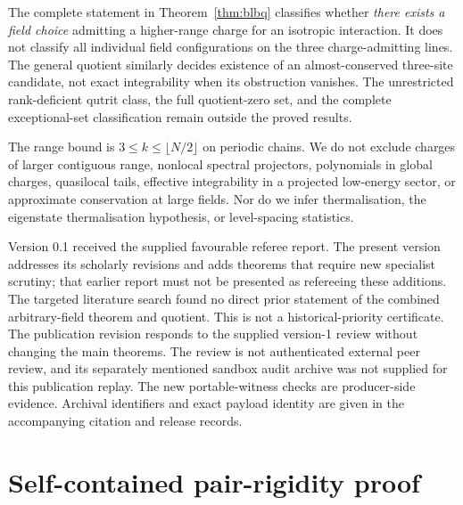 \documentclass[11pt,a4paper]{article}
\numberwithin{equation}{section}
\theoremstyle{definition}\newtheorem{definition}[theorem]{Definition}
\theoremstyle{remark}\newtheorem{remark}[theorem]{Remark}
\begin{document}
The complete statement in Theorem~\ref{thm:blbq} classifies whether \emph{there exists a field choice} admitting a higher-range charge for an isotropic interaction. It does not classify all individual field configurations on the three charge-admitting lines. The general quotient similarly decides existence of an almost-conserved three-site candidate, not exact integrability when its obstruction vanishes. The unrestricted rank-deficient qutrit class, the full quotient-zero set, and the complete exceptional-set classification remain outside the proved results.

The range bound is $3\le k\le\lfloor N/2\rfloor$ on periodic chains. We do not exclude charges of larger contiguous range, nonlocal spectral projectors, polynomials in global charges, quasilocal tails, effective integrability in a projected low-energy sector, or approximate conservation at large fields. Nor do we infer thermalisation, the eigenstate thermalisation hypothesis, or level-spacing statistics.

Version 0.1 received the supplied favourable referee report. The present version addresses its scholarly revisions and adds theorems that require new specialist scrutiny; that earlier report must not be presented as refereeing these additions. The targeted literature search found no direct prior statement of the combined arbitrary-field theorem and quotient. This is not a historical-priority certificate. The publication revision responds to the supplied version-1 review without changing the main theorems. The review is not authenticated external peer review, and its separately mentioned sandbox audit archive was not supplied for this publication replay. The new portable-witness checks are producer-side evidence. Archival identifiers and exact payload identity are given in the accompanying citation and release records.

\appendix
\section{Self-contained pair-rigidity proof}\label{app:pair}
\end{document}
